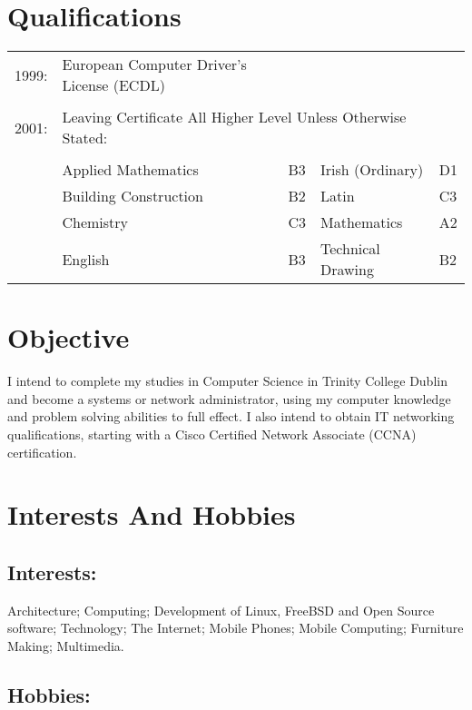 \documentclass[a4paper, 11pt] {article}
\begin{document}
\section*{Qualifications}

\begin{tabular}{l l l l l}
1999: 	& European Computer Driver's License (ECDL) 	&		&	&	\\
			&                         							&		&	&	\\
2001:		& \multicolumn{3}{l}{Leaving Certificate	All Higher Level Unless Otherwise Stated:} 	\\
			&											  			   &		&	&	\\
			& Applied Mathematics								& B3 	&	Irish (Ordinary) 		& D1	\\
			& Building Construction								& B2 	&	Latin 					& C3	\\
			& Chemistry 	   									& C3	&	Mathematics 	   	& A2	\\	
			& English 												& B3 	&	Technical Drawing 	& B2	\\
\end{tabular}

\section*{Objective}

I intend to complete my studies in Computer Science in Trinity College 
Dublin and become a systems or network administrator, using my computer
knowledge and problem solving abilities to full effect. I also intend to
obtain IT networking qualifications, starting with a Cisco Certified
Network Associate (CCNA) certification.

\section*{Interests And Hobbies}

\subsection*{Interests:}

Architecture; Computing; Development of Linux, FreeBSD and Open Source
software; Technology; The Internet; Mobile  Phones; Mobile Computing; 
Furniture Making; Multimedia.

\subsection*{Hobbies:}
\end{document}
